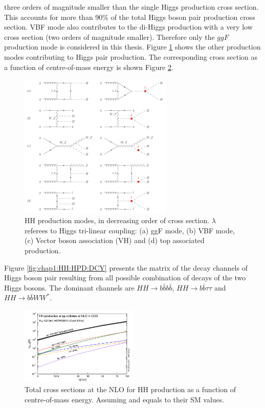three orders of magnitude smaller than the single Higgs production cross section. This accounts for more than 90\% of the total Higgs boson pair production cross section. VBF mode also contributes to the di-Higgs production with a very low cross section (two orders of magnitude smaller). Therefore only the $ggF$ production mode is considered in this thesis. Figure \ref{fig:chap1:HH:HPD:FYS} shows the other production modes contributing to Higgs pair production. The corresponding cross section as a function of centre-of-mass energy is shown Figure \ref{fig:chap1:HH:BSM:XSEC:S}. \\
\begin{figure}[H]
    \centering
    \includegraphics[width=0.65\textwidth]{Ch1/Img/HH_feyns.png}
    \caption{HH production modes, in decreasing order of cross section. $\lambda$ referees to Higgs tri-linear coupling: (a) ggF mode, (b) VBF mode, (c) Vector boson association (VH) and (d) top associated production.}
    \label{fig:chap1:HH:HPD:FYS}
\end{figure}
Figure \ref{fig:chap1:HH:HPD:DCY} presents the matrix of the decay channels of Higgs boson pair resulting from all possible combination of decays of the two Higgs bosons. The dominant channels are $HH\rightarrow b\bar{b}b\bar{b}$, $HH\rightarrow b\bar{b}\tau\tau$ and $HH\rightarrow b\bar{b}WW^*$. 
\begin{figure}[H]
    \centering
    \includegraphics[width=0.5\textwidth]{Ch1/Img/HH_XSec_as_S.png}
    \caption{Total cross sections at the NLO for HH production as a function of centre-of-mass energy. Assuming \kl and \kt equals to their SM values.}
    \label{fig:chap1:HH:BSM:XSEC:S}
\end{figure}
